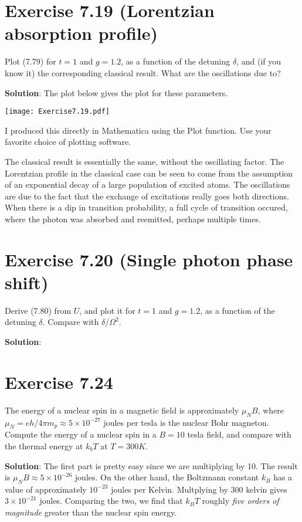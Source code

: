 \documentclass{book}
\begin{document}
\section*{Exercise 7.19 (Lorentzian absorption profile)}
    Plot (7.79) for $t = 1$ and $g = 1.2$, as a function of the detuning $\delta$, and (if you know it) the corresponding classical result. What are the oscillations due to?

    \textbf{Solution}: The plot below gives the plot for these parameters.
    \begin{center}
        \texttt{[image: Exercise7.19.pdf]}
    \end{center}
    I produced this directly in Mathematica using the Plot function. Use your favorite choice of plotting software.

    The classical result is essentially the same, without the oscillating factor. The Lorentzian profile in the classical case can be seen to come from the assumption of an exponential decay of a large population of excited atoms. The oscillations are due to the fact that the exchange of excitations really goes both directions. When there is a dip in transition probability, a full cycle of transition occured, where the photon was absorbed and reemitted, perhaps multiple times. 

\section*{Exercise 7.20 (Single photon phase shift)}
    Derive (7.80) from $U$, and plot it for $t = 1$ and $g = 1.2$, as a function of the detuning $\delta$. Compare with $\delta/\Omega^2$.

    \textbf{Solution}:

\section*{Exercise 7.24}
    The energy of a nuclear spin in a magnetic field is approximately $\mu_N B$, where $\mu_N = eh/4\pi m_p \approx 5\times 10^{-27}$ joules per tesla is the nuclear Bohr magneton. Compute the energy of a nuclear spin in a $B=10$ tesla field, and compare with the thermal energy at $k_b T$ at $T = 300 K$.

    \textbf{Solution}: The first part is pretty easy since we are multiplying by 10. The result is $\mu_N B \approx 5 \times 10^{-26}$ joules. On the other hand, the Boltzmann constant $k_B$ has a value of approximately $10^{-23}$ joules per Kelvin. Multplying by 300 kelvin gives $3 \times 10^{-21}$ joules. Comparing the two, we find that $k_B T$ roughly \emph{five orders of magnitude} greater than the nuclear spin energy. 
\end{document}

